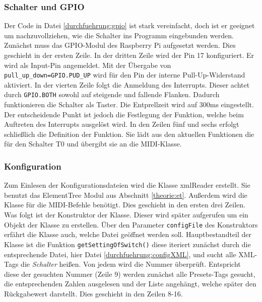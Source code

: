 \subsubsection{Schalter und GPIO}
Der Code in Datei \ref{durchfuehrung:gpio} ist stark vereinfacht, doch ist er geeignet um nachzuvollziehen, wie die Schalter ins Programm eingebunden werden. Zunächst muss das GPIO-Modul des Raspberry Pi aufgesetzt werden. Dies geschieht in der ersten Zeile. In der dritten Zeile wird der Pin 17 konfiguriert. Er wird als Input-Pin angemeldet. Mit der Übergabe von \lstinline[language=mypython]{pull_up_down=GPIO.PUD_UP} wird für den Pin der interne Pull-Up-Widerstand aktiviert. 
In der vierten Zeile folgt die Anmeldung des Interrupts. Dieser achtet durch  \lstinline[language=mypython]{GPIO.BOTH} sowohl auf steigende und fallende Flanken. Dadurch funktionieren die Schalter als Taster. Die Entprellzeit wird auf 300\si{ms} eingestellt. Der entscheidende Punkt ist jedoch die Festlegung der Funktion, welche beim Auftreten des Interrupts ausgelöst wird. In den Zeilen fünf und sechs erfolgt schließlich die Definition der Funktion. Sie lädt aus den aktuellen Funktionen die für den Schalter T0 und übergibt sie an die MIDI-Klasse.

\subsubsection{Konfiguration}
Zum Einlesen der Konfigurationsdateien wird die Klasse xmlReader erstellt. Sie benutzt das ElementTree Modul aus Abschnitt \ref{theorie:et}. Außerdem wird die Klasse für die MIDI-Befehle benötigt. Dies geschieht in den ersten drei Zeilen. Was folgt ist der Konstruktor der Klasse. Dieser wird später aufgerufen um ein Objekt der Klasse zu erstellen. Über den Parameter  \lstinline[language=mypython]{configFile} des Konstruktors erfährt die Klasse auch, welche Datei geöffnet werden soll.
Hauptbestandteil der Klasse ist die Funktion \lstinline[language=mypython]{getSettingOfSwitch()} diese iteriert zunächst durch die entsprechende Datei, hier Datei \ref{durchfuehrung:configXML}, und sucht alle XML-Tags die \emph{Schalter} heißen. Von jedem wird die Nummer überprüft. Entspricht diese der gesuchten Nummer (Zeile 9) werden zunächst alle Presets-Tags gesucht, die entsprechenden Zahlen ausgelesen und der Liste angehängt, welche später den Rückgabewert darstellt. Dies geschieht in den Zeilen 8-16.

